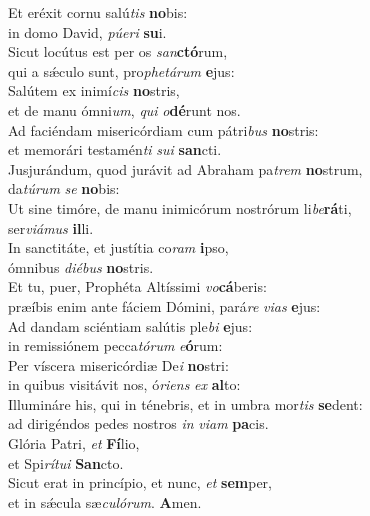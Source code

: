 \evenverse Et eréxit cornu salú\textit{tis} \textbf{no}bis:~\*\\
\evenverse in domo David, \textit{pú}\textit{e}\textit{ri} \textbf{su}i.\\
\oddverse Sicut locútus est per os \textit{san}\textbf{ctó}rum,~\*\\
\oddverse qui a sǽculo sunt, pro\textit{phe}\textit{tá}\textit{rum} \textbf{e}jus:\\
\evenverse Salútem ex inimí\textit{cis} \textbf{no}stris,~\*\\
\evenverse et de manu ómni\textit{um}, \textit{qui} \textit{o}\textbf{dé}runt nos.\\
\oddverse Ad faciéndam misericórdiam cum pátri\textit{bus} \textbf{no}stris:~\*\\
\oddverse et memorári testamén\textit{ti} \textit{su}\textit{i} \textbf{san}cti.\\
\evenverse Jusjurándum, quod jurávit ad Abraham pa\textit{trem} \textbf{no}strum,~\*\\
\evenverse da\textit{tú}\textit{rum} \textit{se} \textbf{no}bis:\\
\oddverse Ut sine timóre, de manu inimicórum nostrórum li\textit{be}\textbf{rá}ti,~\*\\
\oddverse ser\textit{vi}\textit{á}\textit{mus} \textbf{il}li.\\
\evenverse In sanctitáte, et justítia co\textit{ram} \textbf{i}pso,~\*\\
\evenverse ómnibus \textit{di}\textit{é}\textit{bus} \textbf{no}stris.\\
\oddverse Et tu, puer, Prophéta Altíssimi \textit{vo}\textbf{cá}beris:~\*\\
\oddverse præíbis enim ante fáciem Dómini, pará\textit{re} \textit{vi}\textit{as} \textbf{e}jus:\\
\evenverse Ad dandam sciéntiam salútis ple\textit{bi} \textbf{e}jus:~\*\\
\evenverse in remissiónem pecca\textit{tó}\textit{rum} \textit{e}\textbf{ó}rum:\\
\oddverse Per víscera misericórdiæ De\textit{i} \textbf{no}stri:~\*\\
\oddverse in quibus visitávit nos, ó\textit{ri}\textit{ens} \textit{ex} \textbf{al}to:\\
\evenverse Illumináre his, qui in ténebris, et in umbra mor\textit{tis} \textbf{se}dent:~\*\\
\evenverse ad dirigéndos pedes nostros \textit{in} \textit{vi}\textit{am} \textbf{pa}cis.\\
\oddverse Glória Patri, \textit{et} \textbf{Fí}lio,~\*\\
\oddverse et Spi\textit{rí}\textit{tu}\textit{i} \textbf{San}cto.\\
\evenverse Sicut erat in princípio, et nunc, \textit{et} \textbf{sem}per,~\*\\
\evenverse et in sǽcula sæ\textit{cu}\textit{ló}\textit{rum}. \textbf{A}men.\\
